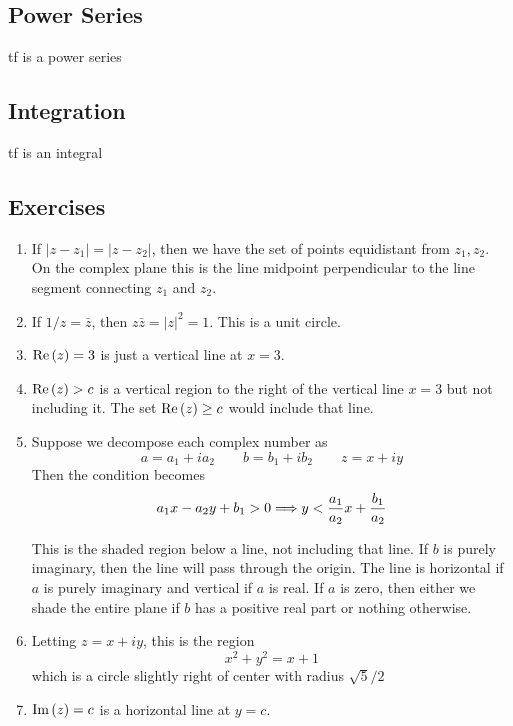 \newpage 
\subsection{Power Series}
tf is a power series

\newpage 
\subsection{Integration}
tf is an integral

\newpage 
\subsection{Exercises}

\begin{exercise} \hfill
	\begin{enumerate}[label=\alph*)]
		\item If $|z - z_1| = |z - z_2|$, then we have the set of points equidistant from $z_1, z_2$. On the complex plane this is the line midpoint perpendicular to the line segment connecting $z_1$ and $z_2$. 
		\item If $1/z = \bar z$, then $z\bar z = |z|^2 = 1$. This is a unit circle.
		\item $\Re\left(z\right) = 3$ is just a vertical line at $x = 3$.
		\item $\Re\left(z\right) > c$ is a vertical region to the right of the vertical line $x = 3$ but not including it. The set $\Re\left(z\right) \geq c$ would include that line.
		\item Suppose we decompose each complex number as
		\[ a = a_1 + i a_2 \qquad b = b_1 + i b_2 \qquad z = x + i y \]
		Then the condition becomes
		\[ a_1 x - a_2 y + b_1 > 0 \Longrightarrow y < \frac{a_1}{a_2} x + \frac{b_1}{a_2} \]
		
		This is the shaded region below a line, not including that line. If $b$ is purely imaginary, then the line will pass through the origin. The line is horizontal if $a$ is purely imaginary and vertical if $a$ is real. If $a$ is zero, then either we shade the entire plane if $b$ has a positive real part or nothing otherwise.
		\item Letting $z = x + iy$, this is the region
		\[ x^2 + y^2 = x + 1 \]
		which is a circle slightly right of center with radius $\sqrt{5}/2$
		\item $\Im\left(z\right) = c$ is a horizontal line at $y = c$.
	\end{enumerate}
\end{exercise}

